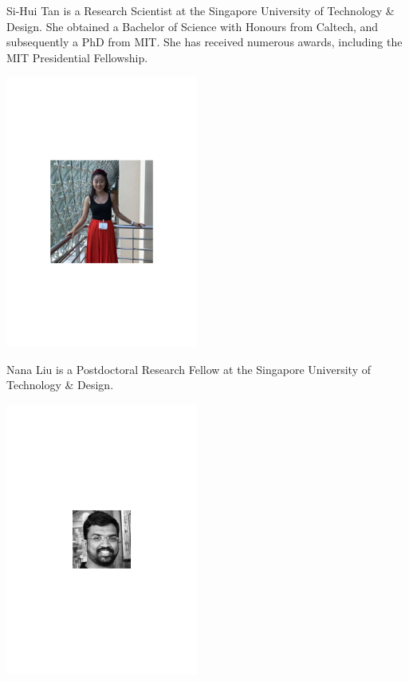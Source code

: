 Si-Hui Tan is a Research Scientist at the Singapore University of Technology \& Design. She obtained a Bachelor of Science with Honours from Caltech, and subsequently a PhD from MIT. She has received numerous awards, including the MIT Presidential Fellowship.


%
%

\begin{center}
\includegraphics[clip=true, width=0.475\textwidth]{photo_nana_liu}
\end{center}

Nana Liu is a Postdoctoral Research Fellow at the Singapore University of Technology \& Design.


%
%

\begin{center}
\includegraphics[clip=true, width=0.475\textwidth]{photo_rohit_ramakrishnan}
\end{center}

